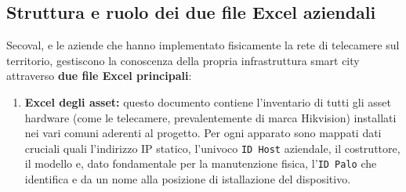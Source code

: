 \documentclass[12pt, a4paper, oneside]{report}
\begin{document}
\subsection{Struttura e ruolo dei due file Excel aziendali}
Secoval, e le aziende che hanno implementato fisicamente la rete di telecamere sul territorio, gestiscono la conoscenza della propria infrastruttura smart city attraverso \textbf{due file Excel principali}:
\begin{enumerate}
    \item \textbf{Excel degli asset:} questo documento contiene l'inventario di tutti gli asset hardware (come le telecamere, prevalentemente di marca Hikvision) installati nei vari comuni aderenti al progetto. Per ogni apparato sono mappati dati cruciali quali l'indirizzo IP statico, l'univoco \texttt{ID Host} aziendale, il costruttore, il modello e, dato fondamentale per la manutenzione fisica, l'\texttt{ID Palo} che identifica e da un nome alla posizione di istallazione del dispositivo.
          \begin{table}[ht]
              \centering
\end{table}
\end{enumerate}
\end{document}
